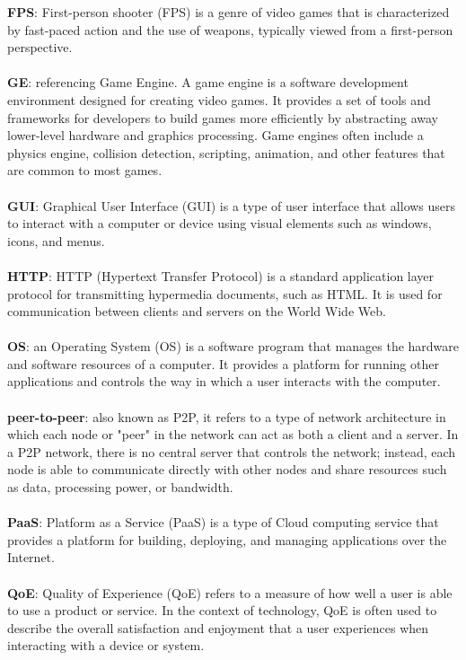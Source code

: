 \textbf{FPS}: First-person shooter (FPS) is a genre of video games that is characterized by fast-paced action and the use of weapons, typically viewed from a first-person perspective. 
\\\\
\textbf{GE}: referencing Game Engine. A game engine is a software development environment designed for creating video games. It provides a set of tools and frameworks for developers to build games more efficiently by abstracting away lower-level hardware and graphics processing. Game engines often include a physics engine, collision detection, scripting, animation, and other features that are common to most games.
\\\\
\textbf{GUI}: Graphical User Interface (GUI) is a type of user interface that allows users to interact with a computer or device using visual elements such as windows, icons, and menus.
\\\\
\textbf{HTTP}: HTTP (Hypertext Transfer Protocol) is a standard application layer protocol for transmitting hypermedia documents, such as HTML. It is used for communication between clients and servers on the World Wide Web. 
\\\\
\textbf{OS}: an Operating System (OS) is a software program that manages the hardware and software resources of a computer. It provides a platform for running other applications and controls the way in which a user interacts with the computer.
\\\\
\textbf{peer-to-peer}: also known as P2P, it refers to a type of network architecture in which each node or "peer" in the network can act as both a client and a server. In a P2P network, there is no central server that controls the network; instead, each node is able to communicate directly with other nodes and share resources such as data, processing power, or bandwidth.
\\\\
\textbf{PaaS}: Platform as a Service (PaaS) is a type of Cloud computing service that provides a platform for building, deploying, and managing applications over the Internet.
\\\\
\textbf{QoE}: Quality of Experience (QoE) refers to a measure of how well a user is able to use a product or service. In the context of technology, QoE is often used to describe the overall satisfaction and enjoyment that a user experiences when interacting with a device or system.
